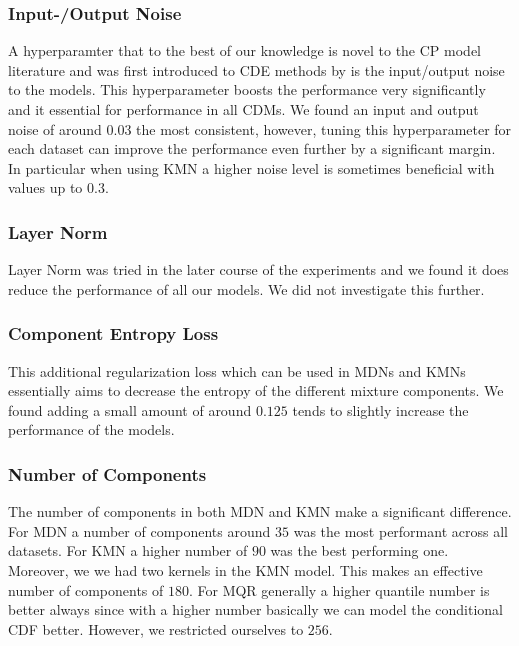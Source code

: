 \subsubsection{Input-/Output Noise}

A hyperparamter that to the best of our knowledge is novel to the CP model literature and was first introduced to CDE methods by \cite{rothfuss2019noise} is the input/output noise to the models. This hyperparameter boosts the performance very significantly and it essential for performance in all CDMs. We found an input and output noise of around $0.03$ the most consistent, however, tuning this hyperparameter for each dataset can improve the performance even further by a significant margin. In particular when using KMN a higher noise level is sometimes beneficial with values up to $0.3$.

\subsubsection{Layer Norm}

Layer Norm was tried in the later course of the experiments and we found it does reduce the performance of all our models. We did not investigate this further.

\subsubsection{Component Entropy Loss}

This additional regularization loss which can be used in MDNs and KMNs essentially aims to decrease the entropy of the different mixture components. We found adding a small amount of around $0.125$ tends to slightly increase the performance of the models.

\subsubsection{Number of Components}

The number of components in both MDN and KMN make a significant difference. For MDN a number of components around $35$ was the most performant across all datasets. For KMN a higher number of $90$ was the best performing one. Moreover, we we had two kernels in the KMN model. This makes an effective number of components of $180$. For MQR generally a higher quantile number is better always since with a higher number basically we can model the conditional CDF better. However, we restricted ourselves to $256$.


